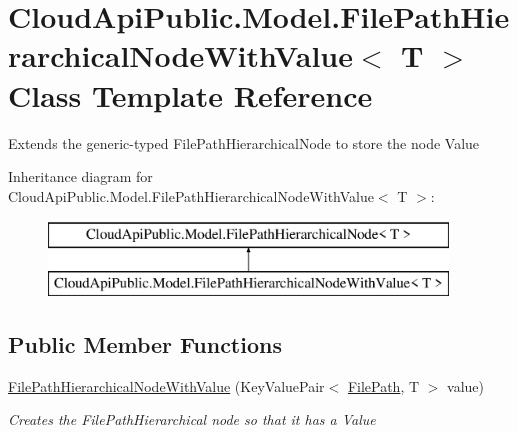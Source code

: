 \hypertarget{class_cloud_api_public_1_1_model_1_1_file_path_hierarchical_node_with_value_3_01_t_01_4}{\section{Cloud\-Api\-Public.\-Model.\-File\-Path\-Hierarchical\-Node\-With\-Value$<$ T $>$ Class Template Reference}
\label{class_cloud_api_public_1_1_model_1_1_file_path_hierarchical_node_with_value_3_01_t_01_4}
}


Extends the generic-\/typed File\-Path\-Hierarchical\-Node to store the node Value  


Inheritance diagram for Cloud\-Api\-Public.\-Model.\-File\-Path\-Hierarchical\-Node\-With\-Value$<$ T $>$\-:\begin{figure}[H]
\begin{center}
\leavevmode
\includegraphics[height=2.000000cm]{class_cloud_api_public_1_1_model_1_1_file_path_hierarchical_node_with_value_3_01_t_01_4}
\end{center}
\end{figure}
\subsection*{Public Member Functions}
\begin{DoxyCompactItemize}
\item 
\hyperlink{class_cloud_api_public_1_1_model_1_1_file_path_hierarchical_node_with_value_3_01_t_01_4_af90046d9cbac139c07cf5a61796ed0be}{File\-Path\-Hierarchical\-Node\-With\-Value} (Key\-Value\-Pair$<$ \hyperlink{class_cloud_api_public_1_1_model_1_1_file_path}{File\-Path}, T $>$ value)
\begin{DoxyCompactList}\small\item\em Creates the File\-Path\-Hierarchical node so that it has a Value \end{DoxyCompactList}\end{DoxyCompactItemize}
